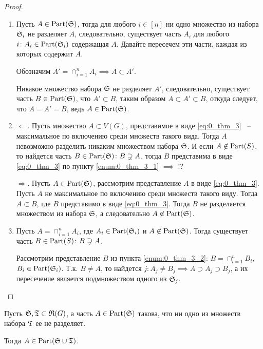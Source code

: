 \begin{proof}
	\begin{enumerate}
		\item Пусть $A \in \Part(\S)$, тогда для любого  $i \in [n]$ ни одно множество из набора  $\S_i$ не разделяет  $A$, следовательно, существует часть $A_i$ для любого $i \colon A_i \in \Part(\S_i)$ содержащая  $A$. Давайте пересечем эти части, каждая из которых содержит $A$.
			
			Обозначим  $A' = \cap_{i = 1}^{n} A_i \implies A \subset A'$.

			Никакое множество набора $\S$ не разделяет  $A'$, следовательно, существует часть  $B \in \Part(\S)$, что  $A' \subset B$, таким образом  $A \subset A' \subset B$, откуда следует, что  $A = A' = B$, ведь $A \in \Part(\S)$. 
		\item $\Longleftarrow$. Пусть множество $A \subset V(G)$, представимое в виде \eqref{eq:0_thm_3} ~-- максимальное по включению среди множеств такого вида. Тогда  $A$ невозможно разделить никаким множеством набора  $\S$. И если  $A \not \in \Part(S)$, то найдется часть  $B \in \Part(\S) \colon B \supsetneq A$, тогда  $B$ представима в виде \eqref{eq:0_thm_3} по пункту \eqref{enum:0_thm_3_1}  $\implies $ !?

			$\Longrightarrow$. Пусть  $A \in \Part(\S)$, рассмотрим представление  $A$ в виде  \eqref{eq:0_thm_3}. Пусть $A$ не максимальное по включению среди множеств такого виду. Тогда  $A \subset B$, где  $B$ представимо в виде \eqref{eq:0_thm_3}. Тогда  $B$ не разделяется множеством из набора  $\S$, а следовательно  $A \not \in \Part(\S)$.

		\item Пусть  $A = \cap_{i = 1}^{n} A_i$, где $A_i \in \Part(\S_i)$ и  $A \not \in \Part(\S)$.
			Тогда существует часть  $B \in \Part(S) \colon B \supsetneq A$.

			Рассмотрим представление  $B$ из пункта \eqref{enum:0_thm_3_2}:  $B = \cap_{i = 1}^{n} B_i$, $B_i \in \Part(\S_i)$. Т.к.  $B \neq A$, то найдется $j \colon A_j \neq B_j \implies A \supset A_j \supset B_j$, а их пересечение является подмножеством одного из  $\S_j$.
	\end{enumerate}
	
\end{proof}

\begin{customlm}{1}
	Пусть $\S, \T \subset \R(G)$, а часть  $A \in \Part(\S)$ такова, что ни одно из множеств набора  $\T$ ее не разделяет.

	Тогда  $A \in \Part(\S \cup \T)$.
\end{customlm}

